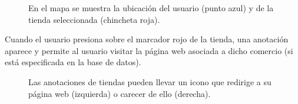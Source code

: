 \begin{figure}[H]
	\centering
	\caption{En el mapa se muestra la ubicación del usuario (punto azul) y de la tienda seleccionada (chincheta roja).}
	\label{fig:mapa}
\end{figure}

Cuando el usuario presiona sobre el marcador rojo de la tienda, una anotación aparece y permite al usuario visitar la página web asociada a dicho comercio (si está especificada en la base de datos).

\begin{figure}[H]
	\centering
	\caption{Las anotaciones de tiendas pueden llevar un icono que redirige a su página web (izquierda) o carecer de ello (derecha).}
	\label{fig:mapa-anotaciones}
\end{figure}

